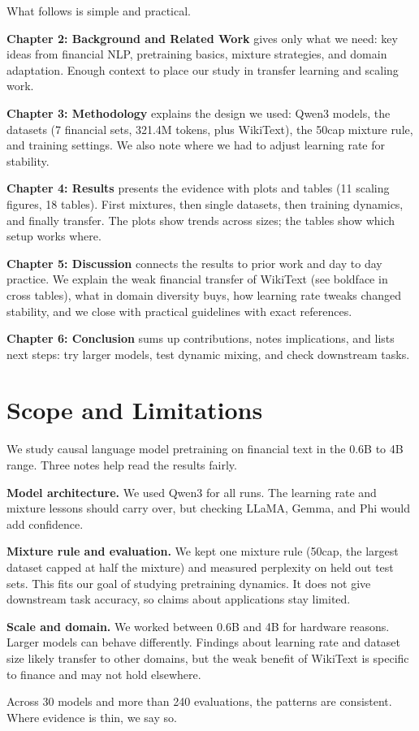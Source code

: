 What follows is simple and practical.

\textbf{Chapter 2: Background and Related Work} gives only what we need: key ideas from financial NLP, pretraining basics, mixture strategies, and domain adaptation. Enough context to place our study in transfer learning and scaling work.

\textbf{Chapter 3: Methodology} explains the design we used: Qwen3 models, the datasets (7 financial sets, 321.4M tokens, plus WikiText), the 50cap mixture rule, and training settings. We also note where we had to adjust learning rate for stability.

\textbf{Chapter 4: Results} presents the evidence with plots and tables (11 scaling figures, 18 tables). First mixtures, then single datasets, then training dynamics, and finally transfer. The plots show trends across sizes; the tables show which setup works where.

\textbf{Chapter 5: Discussion} connects the results to prior work and day to day practice. We explain the weak financial transfer of WikiText (see boldface in cross tables), what in domain diversity buys, how learning rate tweaks changed stability, and we close with practical guidelines with exact references.

\textbf{Chapter 6: Conclusion} sums up contributions, notes implications, and lists next steps: try larger models, test dynamic mixing, and check downstream tasks.

\section{Scope and Limitations}

We study causal language model pretraining on financial text in the 0.6B to 4B range. Three notes help read the results fairly.

\textbf{Model architecture.} We used Qwen3 for all runs. The learning rate and mixture lessons should carry over, but checking LLaMA, Gemma, and Phi would add confidence.

\textbf{Mixture rule and evaluation.} We kept one mixture rule (50cap, the largest dataset capped at half the mixture) and measured perplexity on held out test sets. This fits our goal of studying pretraining dynamics. It does not give downstream task accuracy, so claims about applications stay limited.

\textbf{Scale and domain.} We worked between 0.6B and 4B for hardware reasons. Larger models can behave differently. Findings about learning rate and dataset size likely transfer to other domains, but the weak benefit of WikiText is specific to finance and may not hold elsewhere.

Across 30 models and more than 240 evaluations, the patterns are consistent. Where evidence is thin, we say so.
